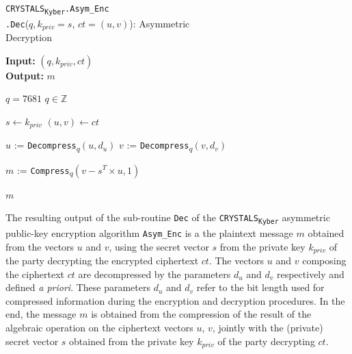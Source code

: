 \documentclass[runningheads]{llncs}
\numberwithin{equation}{section}
\begin{document}
    \begin{algorithm}
        \caption{\texorpdfstring{\texttt{CRYSTALS}\textsubscript{\texttt{Kyber}}\texttt{.Asym\_Enc}\\ \phantom{................................................}\texttt{.Dec}($q,{k}_{priv} = s$, $ct = (u, v)$)}\/: Asymmetric\\ \phantom{................................................................................................}Decryption}
        \label{subrou:crystals-kyber-asymmetric-encryption-dec}
        
        \textbf{Input:} $\left( q, {k}_{priv}, ct \right)$\\
        \textbf{Output:} $ m $
  
        \begin{algorithmic}[1]
            \Require $q = 7681$
            \Ensure $q \in \mathbb{Z}$
            
            \vspace{2ex}

            \State $s \gets {k}_{priv}$
            \State $(u,v) \gets ct$
            
            \vspace{1ex}
            
            \State $u$ := \texttt{Decompress}\textsubscript{$q$}$(u, {d}_{u})$
            \State $v$ := \texttt{Decompress}\textsubscript{$q$}$(v, {d}_{v})$
            
            \vspace{1ex}

            \State $m$ := \texttt{Compress}\textsubscript{$q$}$(v - {s}^{T} \times u, 1)$
            
            \vspace{1ex}
            
            \State \Return $m$
        \end{algorithmic}
    \end{algorithm}    
    \vspace{-4ex}
    
    \noindent The resulting output of the sub-routine \texttt{Dec} of the \texorpdfstring{\texttt{CRYSTALS}\textsubscript{\texttt{Kyber}}}\/ asymmetric public-key encryption algorithm \texttt{Asym\_Enc} is a the plaintext message $m$ obtained from the vectors $u$ and $v$, using the secret vector $s$ from the private key ${k}_{priv}$ of the party decrypting the encrypted ciphertext $ct$. The vectors $u$ and $v$ composing the ciphertext $ct$ are decompressed by the parameters ${d}_{u}$ and ${d}_{v}$ respectively and defined \textit{a priori}. These parameters ${d}_{u}$ and ${d}_{v}$ refer to the bit length used for compressed information during the encryption and decryption procedures. In the end, the message $m$ is obtained from the compression of the result of the algebraic operation on the ciphertext vectors $u$, $v$, jointly with the (private) secret vector $s$ obtained from the private key ${k}_{priv}$ of the party decrypting $ct$.
\end{document}
